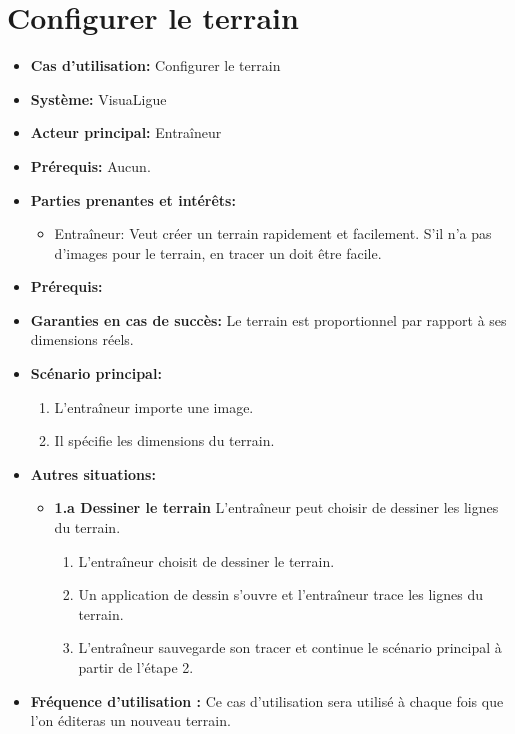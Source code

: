 \section{Configurer le terrain}
\label{sec:configurer_le_terrain}

\begin{itemize}
    \item \textbf{Cas d'utilisation:} Configurer le terrain
    \item \textbf{Syst\`eme:} VisuaLigue
    \item \textbf{Acteur principal:} Entra\^ineur
    \item \textbf{Pr\'erequis:} Aucun.
    \item \textbf{Parties prenantes et int\'er\^ets:}
        \begin{itemize}
            \item Entraîneur: Veut créer un terrain rapidement et facilement. S'il n'a pas d'images pour le terrain, en tracer un doit être facile.
        \end{itemize}
    \item \textbf{Pr\'erequis:}
    \item \textbf{Garanties en cas de succ\`es:} Le terrain est proportionnel par rapport à ses dimensions réels.
    \item \textbf{Sc\'enario principal:}
        \begin{enumerate}
            \item L'entraîneur importe une image.
            \item Il spécifie les dimensions du terrain.
    \end{enumerate}
    \item \textbf{Autres situations:}
        \begin{itemize}
            \item \textbf{1.a Dessiner le terrain} L'entraîneur peut choisir de dessiner les lignes du terrain.
                \begin{enumerate}
                    \item L'entraîneur choisit de dessiner le terrain.
                    \item Un application de dessin s'ouvre et l'entraîneur trace les lignes du terrain.
                    \item L'entraîneur sauvegarde son tracer et continue le scénario principal à partir de l'étape 2.
               \end{enumerate}
 
        \end{itemize}
  	\item \textbf{Fréquence d'utilisation :} Ce cas d'utilisation sera utilisé à chaque fois que l'on éditeras un nouveau terrain.
\end{itemize}



